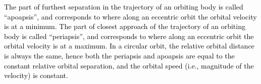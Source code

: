 \documentclass[main.tex]{subfiles}
\begin{document}
\begin{tcolorbox}[sharp corners, colback=red!30, colframe=red!80!blue, title=Box \refstepcounter{educhap3}\label{boxchap3:periapo}\ref{boxchap3:periapo} -- Periapsis and apoapsis]
\par \textcolor{black} { The part of furthest separation in the trajectory of an orbiting body is called ``apoapsis'', and corresponds to where along an eccentric orbit the orbital velocity is at a minimum. The part of closest approach of the trajectory of an orbiting body is called ``periapsis'', and corresponds to where along an eccentric orbit the orbital velocity is at a maximum. In a circular orbit, the relative orbital distance is always the same, hence both the periapsis and apoapsis are equal to the constant relative orbital separation, and the orbital speed (i.e., magnitude of the velocity) is constant. }
\end{tcolorbox}
\end{document}
